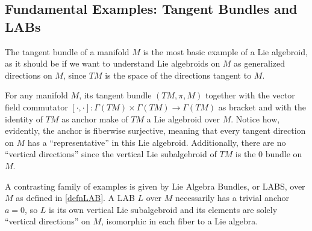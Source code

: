 \subsection{Fundamental Examples: Tangent Bundles and LABs}

The tangent bundle of a manifold $M$ is the most basic example of a Lie algebroid, as it should be if we want to understand Lie algebroids on $M$ as generalized directions on $M$, since $TM$ is the space of the directions tangent to $M$.

For any manifold $M$, its tangent bundle $(TM, \pi, M)$ together with the vector field commutator $[\cdot , \cdot]: \Gamma(TM) \times \Gamma(TM) \to \Gamma(TM)$ as bracket and with the identity of $TM$ as anchor make of $TM$ a Lie algebroid over $M$. Notice how, evidently, the anchor is fiberwise surjective, meaning that every tangent direction on $M$ has a ``representative'' in this Lie algebroid. Additionally, there are no ``vertical directions'' since the vertical Lie subalgebroid of $TM$ is the $0$ bundle on $M$.

A contrasting family of examples is given by Lie Algebra Bundles, or LABS, over $M$ as defined in \ref{defnLAB}. A LAB $L$ over $M$ necessarily has a trivial anchor $a = 0$, so $L$ is its own vertical Lie subalgebroid and its elements are solely ``vertical directions'' on $M$, isomorphic in each fiber to a Lie algebra.






